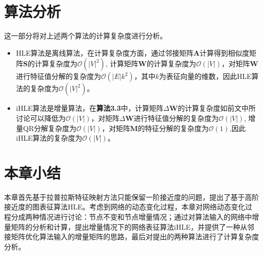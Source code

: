 \section{算法分析}
这一部分将对上述两个算法的计算复杂度进行分析。
\begin{itemize}
	\item HLE算法是离线算法，在计算复杂度方面，通过邻接矩阵\textbf{A}计算得到相似度矩阵\textbf{S}的计算复杂度为$\mathcal{O}(|V|^2)$, 计算矩阵\textbf{W}的计算复杂度为$\mathcal{O}(|V|)$，对矩阵$\textbf{W}$进行特征值分解的复杂度为$\mathcal{O}(|E|k^2)$，其中$k$为表征向量的维数，因此HLE算法的复杂度为$\mathcal{O}(|V|^2)$。
	\item
	iHLE算法是增量算法，在\textbf{算法3.3}中，计算矩阵$\Delta\textbf{W}$的计算复杂度如前文中所讨论可以降低为$\mathcal{O}(|V|)$，对矩阵$\Delta\textbf{W}$进行特征值分解的复杂度为$\mathcal{O}(|V|)$, 增量QR分解复杂度为$\mathcal{O}(|V|)$，对矩阵\textbf{M}的特征分解的复杂度为$\mathcal{O}(1)$,因此iHLE算法的复杂度为$\mathcal{O}(|V|)$。
\end{itemize}

\section{本章小结}
本章首先基于拉普拉斯特征映射方法只能保留一阶接近度的问题，提出了基于高阶接近度的图表征算法HLE。考虑到网络的动态变化过程，本章对网络动态变化过程分成两种情况进行讨论：节点不变和节点增量情况；通过对算法输入的网络中增量矩阵的分析和计算，提出增量情况下的网络表征算法iHLE，并提供了一种从邻接矩阵优化算法输入的增量矩阵的思路，最后对提出的两种算法进行了计算复杂度分析。

